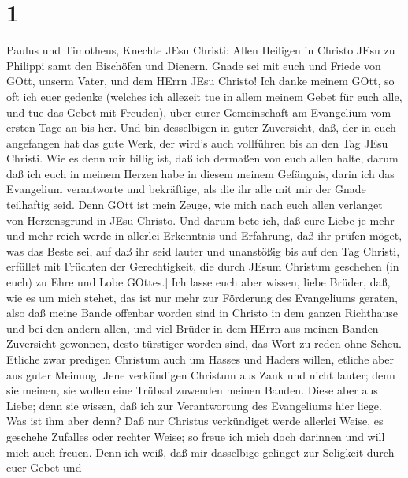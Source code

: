 \hypertarget{section}{%
\section{1}\label{section}}

 Paulus und Timotheus, Knechte JEsu Christi: Allen Heiligen
in Christo JEsu zu Philippi samt den Bischöfen und Dienern. 
Gnade sei mit euch und Friede von GOtt, unserm Vater, und dem HErrn JEsu
Christo!  Ich danke meinem GOtt, so oft ich euer gedenke
 (welches ich allezeit tue in allem meinem Gebet für euch
alle, und tue das Gebet mit Freuden),  über eurer
Gemeinschaft am Evangelium vom ersten Tage an bis her.  Und
bin desselbigen in guter Zuversicht, daß, der in euch angefangen hat das
gute Werk, der wird's auch vollführen bis an den Tag JEsu Christi.
 Wie es denn mir billig ist, daß ich dermaßen von euch allen
halte, darum daß ich euch in meinem Herzen habe in diesem meinem
Gefängnis, darin ich das Evangelium verantworte und bekräftige, als die
ihr alle mit mir der Gnade teilhaftig seid.  Denn GOtt ist
mein Zeuge, wie mich nach euch allen verlanget von Herzensgrund in JEsu
Christo.  Und darum bete ich, daß eure Liebe je mehr und
mehr reich werde in allerlei Erkenntnis und Erfahrung,  daß
ihr prüfen möget, was das Beste sei, auf daß ihr seid lauter und
unanstößig bis auf den Tag Christi,  erfüllet mit Früchten
der Gerechtigkeit, die durch JEsum Christum geschehen (in euch) zu Ehre
und Lobe GOttes.{]}  Ich lasse euch aber wissen, liebe
Brüder, daß, wie es um mich stehet, das ist nur mehr zur Förderung des
Evangeliums geraten,  also daß meine Bande offenbar worden
sind in Christo in dem ganzen Richthause und bei den andern allen,
 und viel Brüder in dem HErrn aus meinen Banden Zuversicht
gewonnen, desto türstiger worden sind, das Wort zu reden ohne Scheu.
 Etliche zwar predigen Christum auch um Hasses und Haders
willen, etliche aber aus guter Meinung.  Jene verkündigen
Christum aus Zank und nicht lauter; denn sie meinen, sie wollen eine
Trübsal zuwenden meinen Banden.  Diese aber aus Liebe; denn
sie wissen, daß ich zur Verantwortung des Evangeliums hier liege.
 Was ist ihm aber denn? Daß nur Christus verkündiget werde
allerlei Weise, es geschehe Zufalles oder rechter Weise; so freue ich
mich doch darinnen und will mich auch freuen.  Denn ich
weiß, daß mir dasselbige gelinget zur Seligkeit durch euer Gebet und
